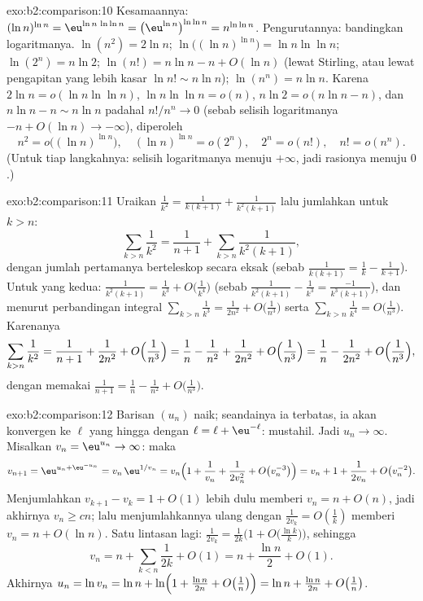 \begin{solution}{exo:b2:comparison:10}
Kesamaannya: $(\ln n)^{\ln n} = \eu^{\ln n\,\ln\ln n} =
\bigl(\eu^{\ln n}\bigr)^{\ln\ln n} = n^{\ln\ln n}$. Pengurutannya:
bandingkan logaritmanya. $\ln(n^2) = 2\ln n$; $\ln\bigl((\ln
n)^{\ln n}\bigr) = \ln n\ln\ln n$; $\ln(2^n) = n\ln2$;
$\ln(n!) = n\ln n - n + O(\ln n)$ (lewat Stirling, atau lewat
pengapitan yang lebih kasar $\ln n! \sim n\ln n$); $\ln(n^n) = n\ln n$.
Karena $2\ln n = o(\ln n\ln\ln n)$, $\ln n\ln\ln n = o(n)$, $n\ln 2 =
o(n\ln n - n)$, dan $n \ln n - n \sim n\ln n$ padahal $n! / n^n \to
0$ (sebab selisih logaritmanya $-n + O(\ln n) \to -\infty$), diperoleh
\[
n^2 = o\bigl((\ln n)^{\ln n}\bigr),\quad
(\ln n)^{\ln n} = o(2^n),\quad
2^n = o(n!),\quad
n! = o(n^n).
\]
(Untuk tiap langkahnya: selisih logaritmanya menuju
$+\infty$, jadi rasionya menuju $0$.)
\end{solution}

\begin{solution}{exo:b2:comparison:11}
Uraikan $\frac1{k^2} = \frac1{k(k+1)} + \frac1{k^2(k+1)}$ lalu
jumlahkan untuk $k > n$:
\[
\sum_{k>n}\frac1{k^2} = \frac1{n+1} +
\sum_{k>n}\frac{1}{k^2(k+1)} ,
\]
dengan jumlah pertamanya berteleskop secara eksak (sebab $\frac1{k(k+1)}
= \frac1k - \frac1{k+1}$). Untuk yang kedua: $\frac{1}{k^2(k+1)} =
\frac1{k^3} + O\bigl(\frac1{k^4}\bigr)$ (sebab $\frac{1}{k^2(k+1)} -
\frac1{k^3} = \frac{-1}{k^3(k+1)}$), dan menurut
perbandingan integral $\sum_{k>n}\frac1{k^3} = \frac1{2n^2} +
O\bigl(\frac1{n^3}\bigr)$ serta $\sum_{k>n}\frac1{k^4} =
O\bigl(\frac1{n^3}\bigr)$. Karenanya
\[
\sum_{k>n}\frac1{k^2}
= \frac1{n+1} + \frac{1}{2n^2} + O\Bigl(\frac1{n^3}\Bigr)
= \frac1n - \frac1{n^2} + \frac{1}{2n^2} +
O\Bigl(\frac1{n^3}\Bigr)
= \frac1n - \frac{1}{2n^2} + O\Bigl(\frac1{n^3}\Bigr),
\]
dengan memakai $\frac1{n+1} = \frac1n - \frac1{n^2} +
O\bigl(\frac1{n^3}\bigr)$.
\end{solution}

\begin{solution}{exo:b2:comparison:12}
Barisan $(u_n)$ naik; seandainya ia terbatas, ia akan konvergen ke
$\ell$ yang hingga dengan $\ell = \ell + \eu^{-\ell}$: mustahil. Jadi
$u_n \to \infty$. Misalkan $v_n = \eu^{u_n} \to \infty$: maka
\[
v_{n+1} = \eu^{u_n + \eu^{-u_n}} = v_n\,\eu^{1/v_n}
= v_n\Bigl(1 + \frac1{v_n} + \frac1{2v_n^2} +
O\bigl(v_n^{-3}\bigr)\Bigr)
= v_n + 1 + \frac{1}{2v_n} + O\bigl(v_n^{-2}\bigr).
\]
Menjumlahkan $v_{k+1} - v_k = 1 + O(1)$ lebih dulu memberi $v_n = n +
O(n)$, jadi akhirnya $v_n \geq cn$; lalu menjumlahkannya ulang dengan
$\frac1{2v_k} = O(\frac1k)$ memberi $v_n = n + O(\ln n)$. Satu lintasan
lagi: $\frac{1}{2v_k} = \frac{1}{2k}\bigl(1 +
O\bigl(\tfrac{\ln k}k\bigr)\bigr)$, sehingga
\[
v_n = n + \sum_{k<n}\frac1{2k} + O(1) = n + \frac{\ln n}2 +
O(1).
\]
Akhirnya $u_n = \ln v_n = \ln n + \ln\Bigl(1 + \frac{\ln n}{2n} +
O\bigl(\tfrac1n\bigr)\Bigr) = \ln n + \frac{\ln n}{2n} +
O\bigl(\tfrac1n\bigr)$.
\end{solution}

